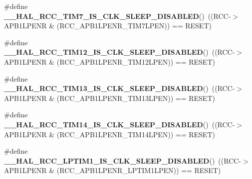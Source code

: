 \begin{DoxyCompactItemize}
\item 
\mbox{\label{group___r_c_c___clock___sleep___enable___disable___status_ga64c55482f4bb2cdb236796b18c28d786}} 
\#define {\bfseries \+\_\+\+\_\+\+H\+A\+L\+\_\+\+R\+C\+C\+\_\+\+T\+I\+M7\+\_\+\+I\+S\+\_\+\+C\+L\+K\+\_\+\+S\+L\+E\+E\+P\+\_\+\+D\+I\+S\+A\+B\+L\+ED}()~((R\+CC-\/$>$A\+P\+B1\+L\+P\+E\+NR \& (R\+C\+C\+\_\+\+A\+P\+B1\+L\+P\+E\+N\+R\+\_\+\+T\+I\+M7\+L\+P\+EN)) == R\+E\+S\+ET)
\item 
\mbox{\label{group___r_c_c___clock___sleep___enable___disable___status_ga5cc99570c53f54e236d951d4e00525ee}} 
\#define {\bfseries \+\_\+\+\_\+\+H\+A\+L\+\_\+\+R\+C\+C\+\_\+\+T\+I\+M12\+\_\+\+I\+S\+\_\+\+C\+L\+K\+\_\+\+S\+L\+E\+E\+P\+\_\+\+D\+I\+S\+A\+B\+L\+ED}()~((R\+CC-\/$>$A\+P\+B1\+L\+P\+E\+NR \& (R\+C\+C\+\_\+\+A\+P\+B1\+L\+P\+E\+N\+R\+\_\+\+T\+I\+M12\+L\+P\+EN)) == R\+E\+S\+ET)
\item 
\mbox{\label{group___r_c_c___clock___sleep___enable___disable___status_gab81e27646b973bb95acac933c79c4522}} 
\#define {\bfseries \+\_\+\+\_\+\+H\+A\+L\+\_\+\+R\+C\+C\+\_\+\+T\+I\+M13\+\_\+\+I\+S\+\_\+\+C\+L\+K\+\_\+\+S\+L\+E\+E\+P\+\_\+\+D\+I\+S\+A\+B\+L\+ED}()~((R\+CC-\/$>$A\+P\+B1\+L\+P\+E\+NR \& (R\+C\+C\+\_\+\+A\+P\+B1\+L\+P\+E\+N\+R\+\_\+\+T\+I\+M13\+L\+P\+EN)) == R\+E\+S\+ET)
\item 
\mbox{\label{group___r_c_c___clock___sleep___enable___disable___status_gad93c4faee8e545c41c29bdf53aa866a6}} 
\#define {\bfseries \+\_\+\+\_\+\+H\+A\+L\+\_\+\+R\+C\+C\+\_\+\+T\+I\+M14\+\_\+\+I\+S\+\_\+\+C\+L\+K\+\_\+\+S\+L\+E\+E\+P\+\_\+\+D\+I\+S\+A\+B\+L\+ED}()~((R\+CC-\/$>$A\+P\+B1\+L\+P\+E\+NR \& (R\+C\+C\+\_\+\+A\+P\+B1\+L\+P\+E\+N\+R\+\_\+\+T\+I\+M14\+L\+P\+EN)) == R\+E\+S\+ET)
\item 
\mbox{\label{group___r_c_c___clock___sleep___enable___disable___status_ga4b5d0c823a0efc995389abaa7e8bef4a}} 
\#define {\bfseries \+\_\+\+\_\+\+H\+A\+L\+\_\+\+R\+C\+C\+\_\+\+L\+P\+T\+I\+M1\+\_\+\+I\+S\+\_\+\+C\+L\+K\+\_\+\+S\+L\+E\+E\+P\+\_\+\+D\+I\+S\+A\+B\+L\+ED}()~((R\+CC-\/$>$A\+P\+B1\+L\+P\+E\+NR \& (R\+C\+C\+\_\+\+A\+P\+B1\+L\+P\+E\+N\+R\+\_\+\+L\+P\+T\+I\+M1\+L\+P\+EN)) == R\+E\+S\+ET)

\end{DoxyCompactItemize}
